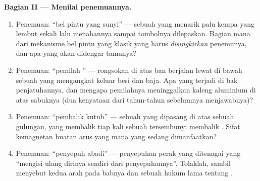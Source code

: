 \begin{problem}
\medskip\noindent\textbf{Bagian II --- Menilai penemuannya.}
\begin{enumerate}[resume]
  \item Penemuan: ``bel pintu yang sunyi'' --- sebuah 
        yang menarik palu kempa yang lembut sekali lalu menahannya
        sampai tombolnya dilepaskan. Bagian mana dari mekanisme bel
        pintu yang klasik yang harus \emph{disingkirkan} penemunya,
        dan apa yang akan didengar tamunya?
  \item Penemuan: ``pemilah '' --- rongsokan di atas ban
        berjalan lewat di bawah sebuah  yang mengangkat
        keluar besi dan baja. Apa yang terjadi di bak penjatuhannya,
        dan mengapa pemilahnya meninggalkan kaleng aluminium di atas
        sabuknya (dua kenyataan  dari tahun-tahun sebelumnya
        menjawabnya)?
  \item Penemuan: ``pembalik kutub'' --- sebuah  yang dipasang
        di atas sebuah gulungan, yang membalik tiap kali sebuah
         tersembunyi membalik . Sifat kemagnetan
        buatan arus yang mana yang sedang dimanfaatkan?
  \item Penemuan: ``penyepuh abadi'' --- penyepuhan perak yang
        ditenagai  yang ``mengisi ulang dirinya sendiri dari
        penyepuhannya''. Tolaklah, sambil menyebut kedua arah 
        pada babnya dan sebuah hukum lama tentang .
\end{enumerate}


\end{problem}
